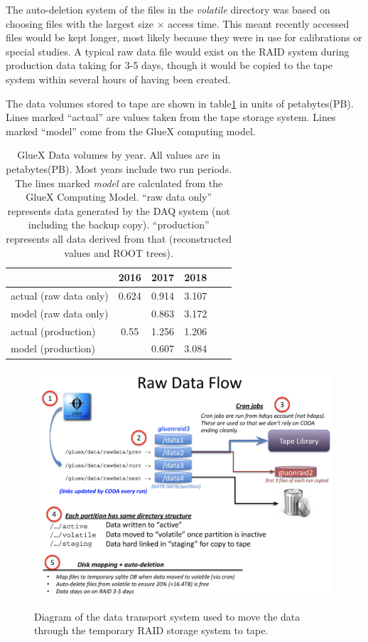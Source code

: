 The auto-deletion system of the files in the \textit{volatile} directory was based on choosing files with the largest size $\times$ access time. This meant recently accessed files would be kept longer, most likely because they were in use for calibrations or special studies. A typical raw data file would exist on the RAID system during production data taking for 3-5 days, though it would be copied to the tape system within several hours of having been created.

The data volumes stored to tape are shown in table\ref{tab:online_data_volumes} in units of petabytes(PB). Lines marked ``actual'' are values taken from the tape storage system. Lines marked ``model'' come from the GlueX computing model\cite{gx3821}.

\begin{table}[]
    \centering
    \begin{tabular}{|l|c|c|c|c|c|}
    \hline
                           & \textbf{2016}  & \textbf{2017}  & \textbf{2018} \\
    \hline
    actual (raw data only) & 0.624 & 0.914 & 3.107 \\
    \hline
     model (raw data only) &       & 0.863 & 3.172 \\
    \hline
    \hline
    actual (production)    & 0.55  & 1.256 & 1.206 \\
    \hline
     model (production)    &       & 0.607 & 3.084 \\
    \hline
    \end{tabular}
    \caption{GlueX Data volumes by year. All values are in petabytes(PB). Most years include two run periods. The lines marked \textit{model} are calculated from the GlueX Computing Model\cite{gx3821}. ``raw data only'' represents data generated by the DAQ system (not including the backup copy). ``production'' represents all data derived from that (reconstructed values and ROOT trees). }
    \label{tab:online_data_volumes}
\end{table}


\begin{figure}[tbp]
\begin{center}
\includegraphics[width=0.99\textwidth]{figures/online_dataflow.png}
\label{fig:online_dataflow}
\caption{Diagram of the data transport system used to move the data through the temporary RAID storage system to tape.}   
\end{center}  
\end{figure}
